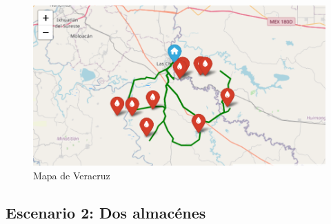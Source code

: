 \documentclass[
  spanish,
  us-letterpaper,
]{scrreprt}
\numberwithin{equation}{chapter} %
\begin{document}
\begin{figure}[H]

{\centering \includegraphics[width=0.9\linewidth,height=\textheight,keepaspectratio]{chapters/mapa_veracruz1.png}

}

\caption{Mapa de Veracruz}

\end{figure}%

\subsection{Escenario 2: Dos
almacénes}\label{escenario-2-dos-almacuxe9nes}
\end{document}
